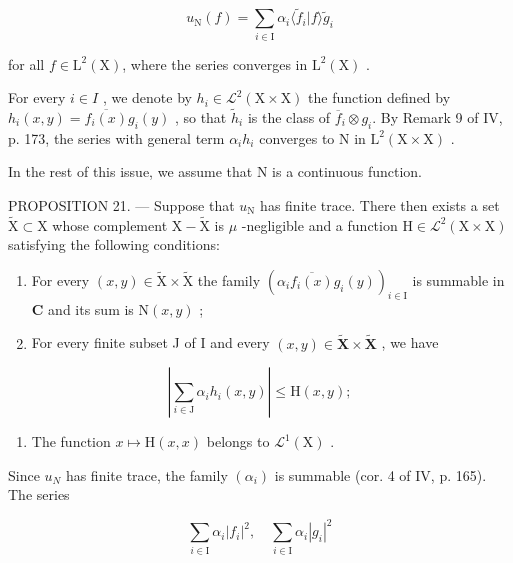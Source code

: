 \[
u _ {\mathrm{N}} (f) = \sum_ {i \in \mathrm{I}} \alpha_ {i} \langle \widetilde {f} _ {i} | f \rangle \widetilde {g} _ {i}\tag{13}
\]

for all \(f \in \mathrm{L}^2(\mathrm{X})\), where the series converges in \(\mathrm{L}^2(\mathrm{X})\) .

For every \(i \in I\) , we denote by \(h_i \in \mathcal{L}^2(\mathrm{X} \times \mathrm{X})\) the function defined by \(h_i(x, y) = \overline{f_i(x)} g_i(y)\) , so that \(\widetilde{h}_i\) is the class of \(\overline{f}_i \otimes g_i\). By Remark 9 of IV, p. 173, the series with general term \(\alpha_i h_i\) converges to N in \(\mathrm{L}^2(\mathrm{X} \times \mathrm{X})\) .

In the rest of this issue, we assume that N is a continuous function.

PROPOSITION 21. --- Suppose that \(u_{\mathrm{N}}\) has finite trace. There then exists a set \(\widetilde{\mathrm{X}} \subset \mathrm{X}\) whose complement \(\mathrm{X} - \widetilde{\mathrm{X}}\) is \(\mu\) -negligible and a function \(\mathrm{H} \in \mathcal{L}^2(\mathrm{X} \times \mathrm{X})\) satisfying the following conditions:

\begin{enumerate}
\def\labelenumi{(\roman{enumi})}
\item
  For every \((x,y)\in\widetilde{\mathrm{X}}\times\widetilde{\mathrm{X}}\) the family \((\alpha_{i}\overline{f_{i}(x)}g_{i}(y))_{i\in\mathrm{I}}\) is summable in \(\mathbf{C}\) and its sum is \(\mathrm{N}(x,y)\) ;
\item
  For every finite subset J of I and every \((x,y)\in\widetilde{\mathbf{X}}\times\widetilde{\mathbf{X}}\) , we have
\end{enumerate}

\[
\left| \sum_ {i \in \mathrm{J}} \alpha_ {i} h _ {i} (x, y) \right| \leqslant \mathrm{H} (x, y);\tag{14}
\]

\begin{enumerate}
\def\labelenumi{(\roman{enumi})}
\setcounter{enumi}{2}
\tightlist
\item
  The function \(x \mapsto \mathrm{H}(x, x)\) belongs to \(\mathcal{L}^1(\mathrm{X})\) .
\end{enumerate}

Since \(u_{N}\) has finite trace, the family \((\alpha_{i})\) is summable (cor. 4 of IV, p. 165). The series

\[
\sum_ {i \in \mathrm{I}} \alpha_ {i} | f _ {i} | ^ {2}, \quad \sum_ {i \in \mathrm{I}} \alpha_ {i} | g _ {i} | ^ {2}
\]


